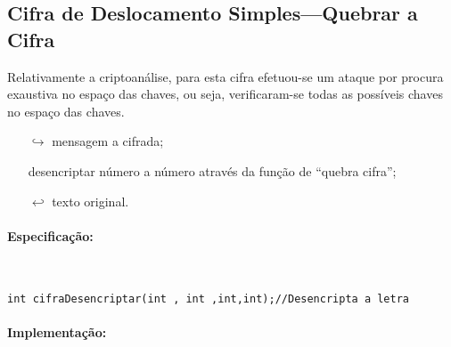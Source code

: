 \subsection{Cifra de Deslocamento Simples---Quebrar a Cifra}
\label{sec:CifraDeslocamentoSimplesQuebraracifra}
Relativamente a criptoanálise, para esta cifra efetuou-se um ataque
por procura exaustiva no espaço das chaves, ou seja, verificaram-se
todas as possíveis chaves no espaço das chaves.


\begin{itemize}
    \item[$\hookrightarrow$] mensagem a cifrada;
    \item[] desencriptar número a número através da função de ``quebra cifra'';
    \item[$\hookleftarrow$] texto original.
\end{itemize}


\paragraph{Especificação:} {\ }

\begin{lstlisting}[frame=single,mathescape=true,caption={Cifra de Deslocamento Simples---Especificação de \texttt{cifraDesencriptar}},captionpos=b,label={lst:DeslocamentoSimplesDesencriptar},basicstyle=\footnotesize]
int cifraDesencriptar(int , int ,int,int);//Desencripta a letra
\end{lstlisting}

\paragraph{Implementação:} {\ }

